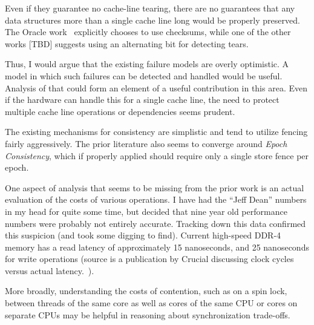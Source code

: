 \documentclass[letterpaper,twocolumn,10pt]{article}
\begin{document}
Even if they guarantee no cache-line tearing, there are no guarantees that any data structures more than a single cache line long would be properly preserved.  The Oracle work~\cite{marathe2018persistent} explicitly chooses to use checksums, while one of the other works [TBD] suggests using an alternating bit for detecting tears.

Thus, I would argue that the existing failure models are overly optimistic.  A model in which such failures can be detected and handled would be useful.
Analysis of that could form an element of a useful contribution in this area.  Even if the hardware can handle this for a single cache line, the need
to protect multiple cache line operations or dependencies seems prudent.

The existing mechanisms for consistency are simplistic and tend to utilize fencing fairly aggressively.  The prior literature also seems to converge around \textit{Epoch Consistency}, which if properly applied should require only a single store fence per epoch.

One aspect of analysis that seems to be missing from the prior work is an actual evaluation of the costs of various operations.  I have had the ``Jeff 
Dean'' numbers in my head for quite some time, but decided that nine year old performance numbers were probably not entirely accurate.  Tracking down 
this data confirmed this suspicion (and took some digging to find).  Current high-speed DDR-4 memory has a read latency of approximately 15 nanoseconds, 
and 25 nanoseconds for write operations (source is a publication by Crucial discussing clock cycles versus actual latency.~\cite{crucial2017latency}).

More broadly, understanding the costs of contention, such as on a spin lock, between threads of the same core as well as cores of the same CPU or cores on separate CPUs may be helpful in reasoning about synchronization trade-offs. 
\end{document}
